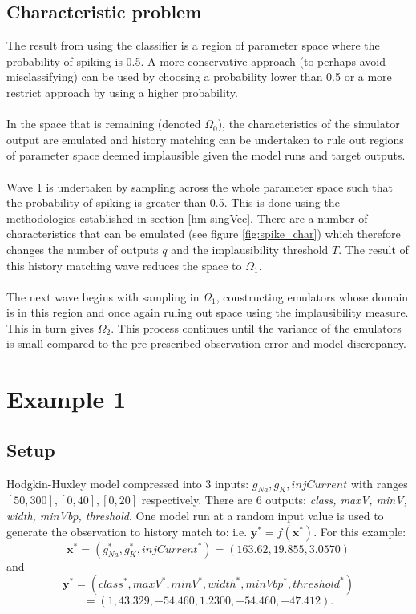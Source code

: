 \documentclass{article}
\newcommand{\numOutputs}{q}
\newcommand{\simulator}{f}
\newcommand{\inputVec}{\mathbf{x}}
\newcommand{\outputVec}{\mathbf{y}}
\newcommand{\NROYspace}{\Omega}
\newcommand{\thresh}{T}
\begin{document}
\subsection{Characteristic problem}
The result from using the classifier is a region of parameter space where the probability of spiking is 0.5. A more conservative approach (to perhaps avoid misclassifying) can be used by choosing a probability lower than 0.5 or a more restrict approach by using a higher probability.\\\\
In the space that is remaining (denoted $\NROYspace_0$), the characteristics of the simulator output are emulated and history matching can be undertaken to rule out regions of parameter space deemed implausible given the model runs and target outputs.\\\\
Wave 1 is undertaken by sampling across the whole parameter space such that the probability of spiking is greater than 0.5. This is done using the methodologies established in section \ref{hm-singVec}. There are a number of characteristics that can be emulated (see figure \ref{fig:spike_char}) which therefore changes the number of outputs $\numOutputs$ and the implausibility threshold $\thresh$. The result of this history matching wave reduces the space to $\NROYspace_1$.\\\\
The next wave begins with sampling in $\NROYspace_1$, constructing emulators whose domain is in this region and once again ruling out space using the implausibility measure. This in turn gives $\NROYspace_2$. This process continues until the variance of the emulators is small compared to the pre-prescribed observation error and model discrepancy.
\section{Example 1}
\subsection{Setup}
Hodgkin-Huxley model compressed into 3 inputs: $g_{Na}, g_K, injCurrent$ with ranges $[50,300], [0,40], [0,20]$ respectively. There are 6 outputs: {\it class, maxV, minV, width, minVbp, threshold}. One model run at a random input value is used to generate the observation to history match to: i.e. $\outputVec^* = \simulator(\inputVec^*)$. For this example:\[\inputVec^* = (g_{Na}^*,g_K^*,injCurrent^*) = (163.62, 19.855, 3.0570)\] and \[\outputVec^* = (class^*, maxV^*, minV^*, width^*, minVbp^*, threshold^*)\]\[ = (1, 43.329, -54.460, 1.2300, -54.460, -47.412).\]
\end{document}
